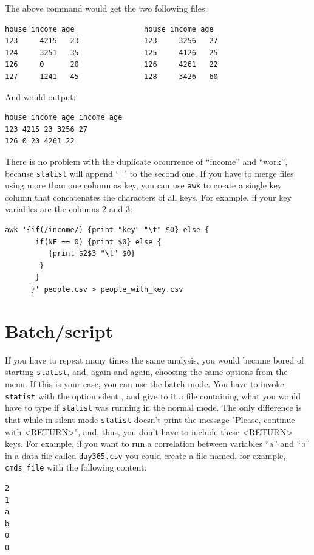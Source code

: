 \documentclass[12pt,english]{article}
\newcommand{\st}{{\tt sta\-tist} }
\begin{document}
The above command would get the two following files:

\begin{verbatim}
house income age                house income age
123     4215   23               123     3256   27
124     3251   35               125     4126   25
126     0      20               126     4261   22
127     1241   45               128     3426   60
\end{verbatim}

And would output:

\begin{verbatim}
house income age income age
123 4215 23 3256 27
126 0 20 4261 22
\end{verbatim}

There is no problem with the duplicate occurrence of
``income'' and ``work'', because \st will append `\_' to the
second one. If you have to merge files using more than one
column as key, you can use {\tt awk} to create a single key
column that concatenates the characters of all keys. For
example, if your key variables are the columns 2 and 3:

\begin{verbatim}
awk '{if(/income/) {print "key" "\t" $0} else {
       if(NF == 0) {print $0} else {
          {print $2$3 "\t" $0}
        }
       }
      }' people.csv > people_with_key.csv
\end{verbatim}

\section{Batch/script}

If you have to repeat many times the same analysis, you
would became bored of starting {\tt sta\-tist}, and, again and again,
choosing the same options from the menu. If this is your
case, you can use the batch mode. You have to invoke \st
with the option {\verb --silent }, and give to it a file
containing what you would have to type if \st was running in
the normal mode. The only difference is that while in silent
mode \st doesn't print the message "Please, continue with
<RETURN>", and, thus, you don't have to include these
<RETURN> keys. For example, if you want to run a correlation
between variables ``a'' and ``b'' in a data file called
{\tt day365.csv} you could create a file named, for example,
{\tt cmds\_file} with the following content:

\begin{verbatim}
2
1
a
b
0
0
\end{verbatim}
\end{document}
